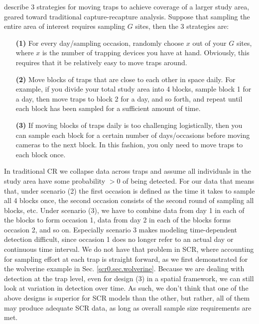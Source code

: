 \citet{karanth_nichols:2002} describe 3 strategies for  moving traps to
achieve coverage of a larger study area, geared toward traditional
capture-recapture analysis. Suppose that sampling the entire area of interest
requires sampling $G$ sites,
then the 3 strategies are:
\begin{itemize}
\item[   {\bf (1)}] For every day/sampling occasion, randomly choose
$x$ out of your $G$ sites, where $x$ is the number of trapping devices
you have at hand. Obviously, this requires that it be relatively easy
to move traps around.
\item[   {\bf (2)}] Move blocks of traps
that are close to each other in space daily. For example, if you
divide your total study area into 4 blocks, sample block 1 for a day,
then move traps to block 2 for a day, and so forth, and repeat until
each block has been sampled for a sufficient amount of time.
\item[   {\bf (3)}] If moving blocks of traps daily is too
challenging logistically, then you can sample each block for a
certain number of days/occasions before moving cameras to the next
block. In this fashion, you only need to move traps to each block
once.
\end{itemize}

In traditional CR we collapse data across traps and assume all
individuals in the study area have some probability $>0$ of being
detected. For our data that means that, under scenario (2) the first
occasion is defined as the time it takes to sample all 4 blocks once,
the second occasion consists of the second round of sampling all
blocks, etc. Under scenario (3), we have to combine data from day 1 in
each of the blocks to form occasion 1, data from day 2 in each of the
blocks forms occasion 2, and so on. Especially scenario 3 makes
modeling time-dependent detection difficult, since occasion 1 does no
longer refer to an actual day or continuous time interval.
We do not have that problem in SCR, where accounting for
 sampling effort at each trap is straight forward, as we first demonstrated
for the wolverine example in Sec. \ref{scr0.sec.wolverine}. Because we
are dealing with detection at the trap level, even for design (3) in a
spatial framework, we can still look at variation in detection over
time. As such, we don't think that one of the above designs is
superior for SCR models than the other, but rather, all of them may
produce adequate SCR data, as long as overall sample size requirements
are met.

